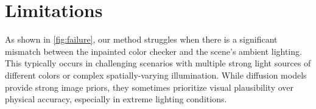 




% 
% 




\section{Limitations}
As shown in \cref{fig:failure}, our method struggles when there is a significant mismatch between the inpainted color checker and the scene's ambient lighting. This typically occurs in challenging scenarios with multiple strong light sources of different colors or complex spatially-varying illumination. While diffusion models provide strong image priors, they sometimes prioritize visual plausibility over physical accuracy, especially in extreme lighting conditions.

